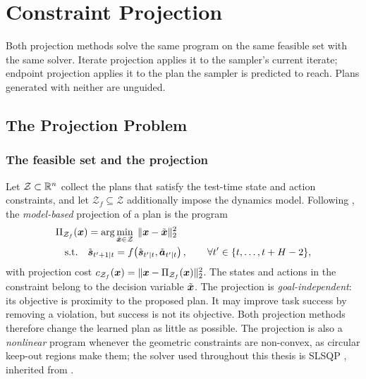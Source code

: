\section{Constraint Projection}\label{sec:method:projection}

Both projection methods solve the same program on the same feasible set with the same solver. Iterate
projection applies it to the sampler's current iterate; endpoint projection applies it to the plan the
sampler is predicted to reach. Plans generated with neither are unguided.

\subsection{The Projection Problem}\label{sec:method:proj}

\subsubsection*{The feasible set and the projection}

Let $\mathcal{Z} \subset \mathbb{R}^{n}$ collect the plans that satisfy the test-time state and action
constraints, and let $\mathcal{Z}_{f} \subseteq \mathcal{Z}$ additionally impose the dynamics
model. Following \parencite[Eq.~(9)]{romer2025diffusion}, the \emph{model-based} projection of a plan is the
program
\begin{align}
  \Pi_{\mathcal{Z}_{f}}(\boldsymbol{x})
    &= \arg\min_{\tilde{\boldsymbol{x}}\in\mathcal{Z}} \;\|\boldsymbol{x}-\tilde{\boldsymbol{x}}\|_{2}^{2}
    \label{eq:bg:mpc:proj} \\
  \text{s.t.}\quad & \tilde{\boldsymbol{s}}_{t'+1|t}
    = f\!\left(\tilde{\boldsymbol{s}}_{t'|t},\tilde{\boldsymbol{a}}_{t'|t}\right),
    \qquad \forall t' \in \{t,\dots,t+H-2\},
    \label{eq:bg:mpc:dyn}
\end{align}
with projection cost $c_{\mathcal{Z}_{f}}(\boldsymbol{x}) = \|\boldsymbol{x}-\Pi_{\mathcal{Z}_{f}}(\boldsymbol{x})\|_{2}^{2}$.
The states and actions in the constraint belong to the decision variable $\tilde{\boldsymbol{x}}$.
The projection is \emph{goal-independent}: its objective is proximity to the proposed plan.
It may improve task success by removing a violation, but success is not its objective. Both projection methods therefore
change the learned plan as little as possible. The projection is
also a \emph{nonlinear} program whenever the geometric
constraints are non-convex, as circular keep-out regions make them; the solver used throughout
this thesis is \ac{SLSQP}
\parencite{kraft1988software,virtanen2020scipy}, inherited from \parencite{romer2025diffusion}.

